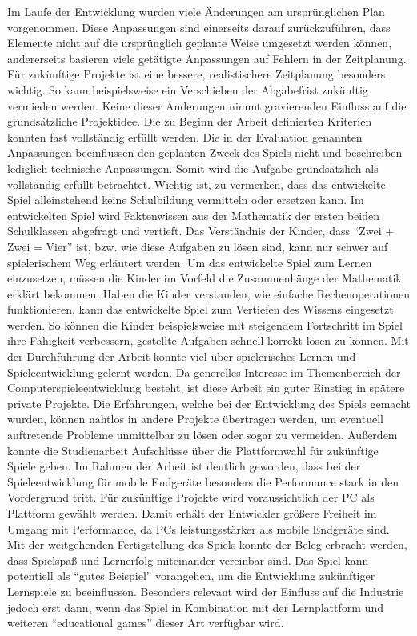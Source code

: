 Im Laufe der Entwicklung wurden viele Änderungen am ursprünglichen Plan vorgenommen. Diese Anpassungen sind einerseits darauf zurückzuführen, dass Elemente nicht auf die ursprünglich geplante Weise umgesetzt werden können, andererseits basieren viele getätigte Anpassungen auf Fehlern in der Zeitplanung. Für zukünftige Projekte ist eine bessere, realistischere Zeitplanung besonders wichtig. So kann beispielsweise ein Verschieben der Abgabefrist zukünftig vermieden werden.
Keine dieser Änderungen nimmt gravierenden Einfluss auf die grundsätzliche Projektidee. Die zu Beginn der Arbeit definierten Kriterien konnten fast vollständig erfüllt werden. Die in der Evaluation genannten Anpassungen beeinflussen den geplanten Zweck des Spiels nicht und beschreiben lediglich technische Anpassungen. Somit wird die Aufgabe grundsätzlich als vollständig erfüllt betrachtet.
Wichtig ist, zu vermerken, dass das entwickelte Spiel alleinstehend keine Schulbildung vermitteln oder ersetzen kann. Im entwickelten Spiel wird Faktenwissen aus der Mathematik der ersten beiden Schulklassen abgefragt und vertieft. Das Verständnis der Kinder, dass \enquote{Zwei + Zwei = Vier} ist, bzw. wie diese Aufgaben zu lösen sind, kann nur schwer auf spielerischem Weg erläutert werden. Um das entwickelte Spiel zum Lernen einzusetzen, müssen die Kinder im Vorfeld die Zusammenhänge der Mathematik erklärt bekommen. Haben die Kinder verstanden, wie einfache Rechenoperationen funktionieren, kann das entwickelte Spiel zum Vertiefen des Wissens eingesetzt werden. So können die Kinder beispielsweise mit steigendem Fortschritt im Spiel ihre Fähigkeit verbessern, gestellte Aufgaben schnell korrekt lösen zu können.
Mit der Durchführung der Arbeit konnte viel über spielerisches Lernen und Spieleentwicklung gelernt werden. Da generelles Interesse im Themenbereich der Computerspieleentwicklung besteht, ist diese Arbeit ein guter Einstieg in spätere private Projekte. Die Erfahrungen, welche bei der Entwicklung des Spiels gemacht wurden, können nahtlos in andere Projekte übertragen werden, um eventuell auftretende Probleme unmittelbar zu lösen oder sogar zu vermeiden. Außerdem konnte die Studienarbeit Aufschlüsse über die Plattformwahl für zukünftige Spiele geben. Im Rahmen der Arbeit ist deutlich geworden, dass bei der Spieleentwicklung für mobile Endgeräte besonders die Performance stark in den Vordergrund tritt. Für zukünftige Projekte wird voraussichtlich der PC als Plattform gewählt werden. Damit erhält der Entwickler größere Freiheit im Umgang mit Performance, da PCs leistungsstärker als mobile Endgeräte sind.
Mit der weitgehenden Fertigstellung des Spiels konnte der Beleg erbracht werden, dass Spielspaß und Lernerfolg miteinander vereinbar sind. Das Spiel kann potentiell als \enquote{gutes Beispiel} vorangehen, um die Entwicklung zukünftiger Lernspiele zu beeinflussen. Besonders relevant wird der Einfluss auf die Industrie jedoch erst dann, wenn das Spiel in Kombination mit der Lernplattform und weiteren \enquote{educational games} dieser Art verfügbar wird.


